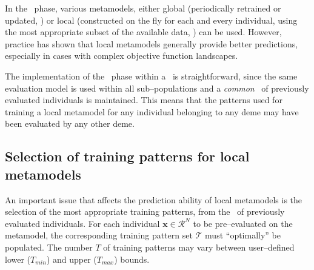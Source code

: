\documentclass{vki_ls}
\newcommand{\vect}[1]{\bm{#1}}
\newcommand{\set}[1]{\mathcal{#1}}
\begin{document}
In the \IPE\ phase, various metamodels, either global (periodically retrained or updated, \cite{Jin2004}) or local (constructed on the fly for each and every individual, using the most appropriate subset of the available data, \cite{LTT_2_023}) can be used. 
However, practice has shown \cite{LTT_3_054, LTT_2_018} that local metamodels generally provide better predictions, especially in cases with complex objective function landscapes. 

The implementation of the \IPE\ phase within a \DEA\ is straightforward, since the same evaluation model is used within all sub--populations and a \textit{common} \DB\ of previously evaluated individuals is maintained. 
This means that the patterns used for training a local metamodel for any individual belonging to any deme may have been evaluated by any other deme.
%
%
\subsection[Selection of Training Patterns]
{Selection of training patterns for local metamodels}
\label{tps}

An important issue that affects the prediction ability of local metamodels is the selection of the most appropriate training patterns, from the \DB\ of previously evaluated individuals. 
For each individual $\vect{x}\!\in\!\set{R}^N$ to be pre--evaluated on the metamodel, the corresponding training pattern set $\set{T}$ must ``optimally'' be populated. 
The number $T$ of training patterns may vary between user--defined lower ($T_{min}$) and upper ($T_{max}$) bounds. 
\end{document}
